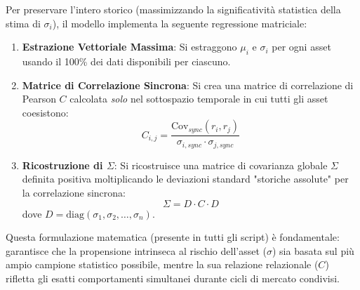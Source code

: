 Per preservare l'intero storico (massimizzando la significatività statistica della stima di $\sigma_i$), il modello implementa la seguente regressione matriciale:
\begin{enumerate}
    \item \textbf{Estrazione Vettoriale Massima}: Si estraggono $\mu_i$ e $\sigma_i$ per ogni asset usando il 100\% dei dati disponibili per ciascuno.
    \item \textbf{Matrice di Correlazione Sincrona}: Si crea una matrice di correlazione di Pearson $C$ calcolata \emph{solo} nel sottospazio temporale in cui tutti gli asset coesistono:
    \begin{equation}
    C_{i,j} = \frac{\text{Cov}_{sync}(r_i, r_j)}{\sigma_{i,sync} \cdot \sigma_{j,sync}}
    \end{equation}
    \item \textbf{Ricostruzione di $\Sigma$}: Si ricostruisce una matrice di covarianza globale $\Sigma$ definita positiva moltiplicando le deviazioni standard "storiche assolute" per la correlazione sincrona:
    \begin{equation}
    \Sigma = D \cdot C \cdot D
    \end{equation}
    dove $D = \text{diag}(\sigma_1, \sigma_2, \dots, \sigma_n)$.
\end{enumerate}

Questa formulazione matematica (presente in tutti gli script) è fondamentale: garantisce che la propensione intrinseca al rischio dell'asset ($\sigma$) sia basata sul più ampio campione statistico possibile, mentre la sua relazione relazionale ($C$) rifletta gli esatti comportamenti simultanei durante cicli di mercato condivisi.
